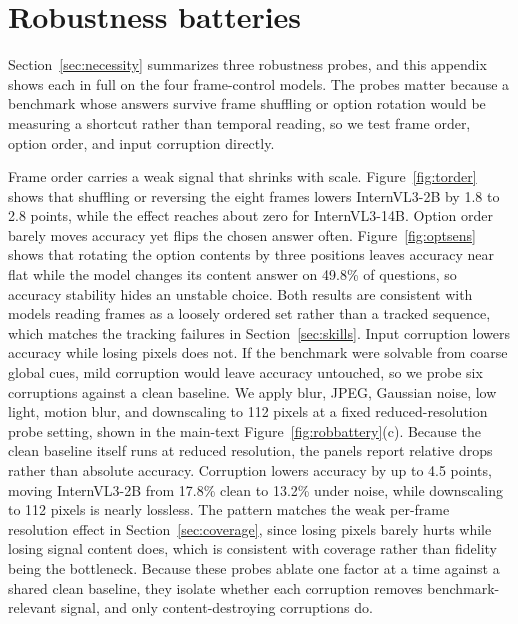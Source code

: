 \documentclass{article}
\begin{document}
\section{Robustness batteries}
\label{app:corruption}
Section~\ref{sec:necessity} summarizes three robustness probes, and this appendix shows each in full on the four frame-control models. The probes matter because a benchmark whose answers survive frame shuffling or option rotation would be measuring a shortcut rather than temporal reading, so we test frame order, option order, and input corruption directly.

Frame order carries a weak signal that shrinks with scale. Figure~\ref{fig:torder} shows that shuffling or reversing the eight frames lowers InternVL3-2B by 1.8 to 2.8 points, while the effect reaches about zero for InternVL3-14B. Option order barely moves accuracy yet flips the chosen answer often. Figure~\ref{fig:optsens} shows that rotating the option contents by three positions leaves accuracy near flat while the model changes its content answer on 49.8\% of questions, so accuracy stability hides an unstable choice. Both results are consistent with models reading frames as a loosely ordered set rather than a tracked sequence, which matches the tracking failures in Section~\ref{sec:skills}.
Input corruption lowers accuracy while losing pixels does not. If the benchmark were solvable from coarse global cues, mild corruption would leave accuracy untouched, so we probe six corruptions against a clean baseline. We apply blur, JPEG, Gaussian noise, low light, motion blur, and downscaling to 112 pixels at a fixed reduced-resolution probe setting, shown in the main-text Figure~\ref{fig:robbattery}(c). Because the clean baseline itself runs at reduced resolution, the panels report relative drops rather than absolute accuracy. Corruption lowers accuracy by up to 4.5 points, moving InternVL3-2B from 17.8\% clean to 13.2\% under noise, while downscaling to 112 pixels is nearly lossless. The pattern matches the weak per-frame resolution effect in Section~\ref{sec:coverage}, since losing pixels barely hurts while losing signal content does, which is consistent with coverage rather than fidelity being the bottleneck. Because these probes ablate one factor at a time against a shared clean baseline, they isolate whether each corruption removes benchmark-relevant signal, and only content-destroying corruptions do.
\end{document}
